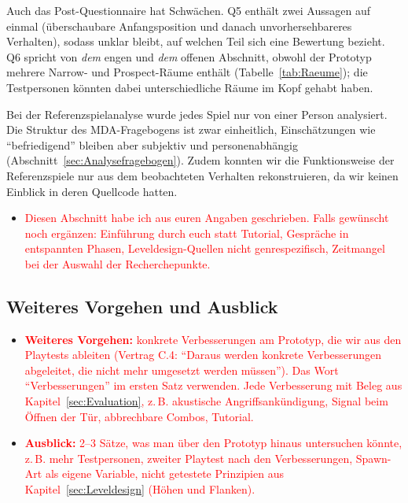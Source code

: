 \documentclass[../Main.tex]{subfiles}
\begin{document}
Auch das Post-Questionnaire hat Schwächen. Q5 enthält zwei Aussagen auf einmal (überschaubare Anfangsposition und danach unvorhersehbareres Verhalten), sodass unklar bleibt, auf welchen Teil sich eine Bewertung bezieht. Q6 spricht von \emph{dem} engen und \emph{dem} offenen Abschnitt, obwohl der Prototyp mehrere Narrow- und Prospect-Räume enthält (Tabelle~\ref{tab:Raeume}); die Testpersonen könnten dabei unterschiedliche Räume im Kopf gehabt haben.

Bei der Referenzspielanalyse wurde jedes Spiel nur von einer Person analysiert. Die Struktur des MDA-Fragebogens ist zwar einheitlich, Einschätzungen wie \enquote{befriedigend} bleiben aber subjektiv und personenabhängig (Abschnitt~\ref{sec:Analysefragebogen}). Zudem konnten wir die Funktionsweise der Referenzspiele nur aus dem beobachteten Verhalten rekonstruieren, da wir keinen Einblick in deren Quellcode hatten.

\begin{itemize}[leftmargin=1.5cm]
    \item \textcolor{red}{Diesen Abschnitt habe ich aus euren Angaben geschrieben. Falls gewünscht noch ergänzen: Einführung durch euch statt Tutorial, Gespräche in entspannten Phasen, Leveldesign-Quellen nicht genrespezifisch, Zeitmangel bei der Auswahl der Recherchepunkte.}
\end{itemize}

\subsection{Weiteres Vorgehen und Ausblick} \label{sec:Verbesserungen}

\begin{itemize}[leftmargin=1.5cm]
    \item \textcolor{red}{\textbf{Weiteres Vorgehen:} konkrete Verbesserungen am Prototyp, die wir aus den Playtests ableiten (Vertrag C.4: \enquote{Daraus werden konkrete Verbesserungen abgeleitet, die nicht mehr umgesetzt werden müssen}). Das Wort \enquote{Verbesserungen} im ersten Satz verwenden. Jede Verbesserung mit Beleg aus Kapitel~\ref{sec:Evaluation}, z.\,B. akustische Angriffsankündigung, Signal beim Öffnen der Tür, abbrechbare Combos, Tutorial.}
    \item \textcolor{red}{\textbf{Ausblick:} 2--3 Sätze, was man über den Prototyp hinaus untersuchen könnte, z.\,B. mehr Testpersonen, zweiter Playtest nach den Verbesserungen, Spawn-Art als eigene Variable, nicht getestete Prinzipien aus Kapitel~\ref{sec:Leveldesign} (Höhen und Flanken).}
\end{itemize}
\end{document}

